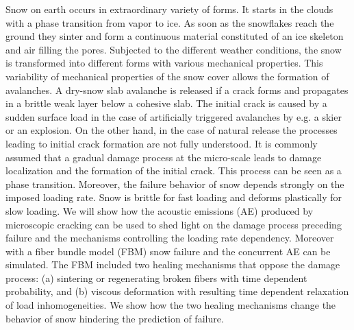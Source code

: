 \noindent Snow on earth occurs in extraordinary variety of forms. It starts in the clouds with a phase transition from vapor to ice. As soon as the snowflakes reach the ground they sinter and form a continuous material constituted of an ice skeleton and air filling the pores. Subjected to the different weather conditions, the snow is transformed into different forms with various mechanical properties. This variability of mechanical properties of the snow cover allows the formation of avalanches. A dry-snow slab avalanche is released if a crack forms and propagates in a brittle weak layer below a cohesive slab. The initial crack is caused by a sudden surface load in the case of artificially triggered avalanches by e.g. a skier or an explosion. On the other hand, in the case of natural release the processes leading to initial crack formation are not fully understood. It is commonly assumed that a gradual damage process at the micro-scale leads to damage localization and the formation of the initial crack. This process can be seen as a phase transition. Moreover, the failure behavior of snow depends strongly on the imposed loading rate. Snow is brittle for fast loading and deforms plastically for slow loading. We will show how the acoustic emissions (AE) produced by microscopic cracking can be used to shed light on the damage process preceding failure and the mechanisms controlling the loading rate dependency. Moreover with a fiber bundle model (FBM) snow failure and the concurrent AE can be simulated. The FBM included two healing mechanisms that oppose the damage process: (a) sintering or regenerating broken fibers with time dependent probability, and (b) viscous deformation with resulting time dependent relaxation of load inhomogeneities. We show how the two healing mechanisms change the behavior of snow hindering the prediction of failure.\par
\newpage



